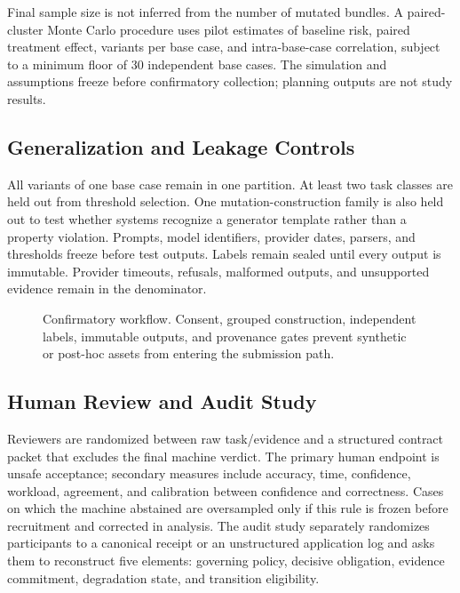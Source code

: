\documentclass[sigconf,anonymous,review]{acmart}
\begin{document}
Final sample size is not inferred from the number of mutated bundles. A paired-cluster Monte Carlo procedure uses pilot estimates of baseline risk, paired treatment effect, variants per base case, and intra-base-case correlation, subject to a minimum floor of 30 independent base cases. The simulation and assumptions freeze before confirmatory collection; planning outputs are not study results.

\subsection{Generalization and Leakage Controls}
All variants of one base case remain in one partition. At least two task classes are held out from threshold selection. One mutation-construction family is also held out to test whether systems recognize a generator template rather than a property violation. Prompts, model identifiers, provider dates, parsers, and thresholds freeze before test outputs. Labels remain sealed until every output is immutable. Provider timeouts, refusals, malformed outputs, and unsupported evidence remain in the denominator.

\begin{figure}[t]
\centering

\caption{Confirmatory workflow. Consent, grouped construction, independent labels, immutable outputs, and provenance gates prevent synthetic or post-hoc assets from entering the submission path.}
\label{fig:protocol}
\end{figure}

\subsection{Human Review and Audit Study}
Reviewers are randomized between raw task/evidence and a structured contract packet that excludes the final machine verdict. The primary human endpoint is unsafe acceptance; secondary measures include accuracy, time, confidence, workload, agreement, and calibration between confidence and correctness. Cases on which the machine abstained are oversampled only if this rule is frozen before recruitment and corrected in analysis. The audit study separately randomizes participants to a canonical receipt or an unstructured application log and asks them to reconstruct five elements: governing policy, decisive obligation, evidence commitment, degradation state, and transition eligibility.
\end{document}
